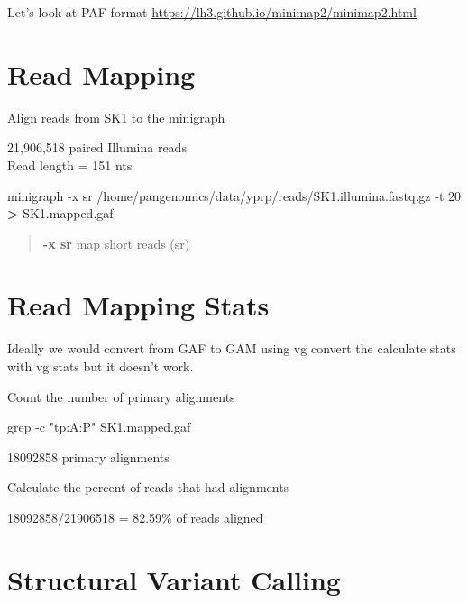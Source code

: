 \documentclass[
]{book}
\newenvironment{Shaded}{\begin{snugshade}}{\end{snugshade}}
\newcommand{\AttributeTok}[1]{\textcolor[rgb]{0.77,0.63,0.00}{#1}}
\newcommand{\ExtensionTok}[1]{#1}
\newcommand{\FunctionTok}[1]{\textcolor[rgb]{0.00,0.00,0.00}{#1}}
\newcommand{\NormalTok}[1]{#1}
\newcommand{\OperatorTok}[1]{\textcolor[rgb]{0.81,0.36,0.00}{\textbf{#1}}}
\newcommand{\StringTok}[1]{\textcolor[rgb]{0.31,0.60,0.02}{#1}}
\begin{document}
Let's look at PAF format
\url{https://lh3.github.io/minimap2/minimap2.html}

\hypertarget{read-mapping-1}{%
\section{Read Mapping}\label{read-mapping-1}}

Align reads from SK1 to the minigraph

21,906,518 paired Illumina reads\\
Read length = 151 nts

\begin{Shaded}
\begin{Highlighting}[]
\ExtensionTok{minigraph} \AttributeTok{{-}x}\NormalTok{ sr /home/pangenomics/data/yprp/reads/SK1.illumina.fastq.gz }\AttributeTok{{-}t}\NormalTok{ 20 }\OperatorTok{\textgreater{}}\NormalTok{ SK1.mapped.gaf}
\end{Highlighting}
\end{Shaded}

\begin{quote}
\textbf{-x sr} map short reads (sr)
\end{quote}

\hypertarget{read-mapping-stats}{%
\section{Read Mapping Stats}\label{read-mapping-stats}}

Ideally we would convert from GAF to GAM using vg convert the calculate stats with vg stats but it doesn't work.

Count the number of primary alignments

\begin{Shaded}
\begin{Highlighting}[]
\FunctionTok{grep} \AttributeTok{{-}c} \StringTok{"tp:A:P"}\NormalTok{ SK1.mapped.gaf}
\end{Highlighting}
\end{Shaded}

18092858 primary alignments

Calculate the percent of reads that had alignments

18092858/21906518 = 82.59\% of reads aligned

\hypertarget{structural-variant-calling}{%
\section{Structural Variant Calling}\label{structural-variant-calling}}
\end{document}
